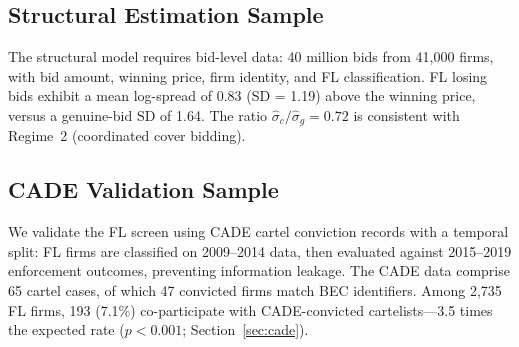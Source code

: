 

\subsection{Structural Estimation Sample}
\label{sec:structural_sample}

The structural model requires bid-level data: 40 million bids from 41,000 firms, with bid amount, winning price, firm identity, and FL classification. FL losing bids exhibit a mean log-spread of 0.83 (SD = 1.19) above the winning price, versus a genuine-bid SD of 1.64. The ratio $\hat{\sigma}_c / \hat{\sigma}_g = 0.72$ is consistent with Regime~2 (coordinated cover bidding).

\subsection{CADE Validation Sample}
\label{sec:cade_sample}

We validate the FL screen using CADE cartel conviction records with a temporal split: FL firms are classified on 2009--2014 data, then evaluated against 2015--2019 enforcement outcomes, preventing information leakage. The CADE data comprise 65 cartel cases, of which 47 convicted firms match BEC identifiers. Among 2,735 FL firms, 193 (7.1\%) co-participate with CADE-convicted cartelists---3.5 times the expected rate ($p < 0.001$; Section~\ref{sec:cade}).
